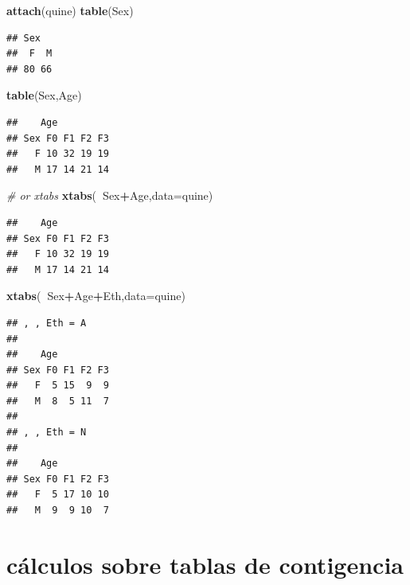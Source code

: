 \documentclass[]{book}
\newenvironment{Shaded}{\begin{snugshade}}{\end{snugshade}}
\newcommand{\KeywordTok}[1]{\textcolor[rgb]{0.13,0.29,0.53}{\textbf{#1}}}
\newcommand{\DataTypeTok}[1]{\textcolor[rgb]{0.13,0.29,0.53}{#1}}
\newcommand{\CommentTok}[1]{\textcolor[rgb]{0.56,0.35,0.01}{\textit{#1}}}
\newcommand{\OperatorTok}[1]{\textcolor[rgb]{0.81,0.36,0.00}{\textbf{#1}}}
\newcommand{\NormalTok}[1]{#1}
\begin{document}
\begin{Shaded}
\begin{Highlighting}[]
\KeywordTok{attach}\NormalTok{(quine)}
\KeywordTok{table}\NormalTok{(Sex)}
\end{Highlighting}
\end{Shaded}

\begin{verbatim}
## Sex
##  F  M 
## 80 66
\end{verbatim}

\begin{Shaded}
\begin{Highlighting}[]
\KeywordTok{table}\NormalTok{(Sex,Age)}
\end{Highlighting}
\end{Shaded}

\begin{verbatim}
##    Age
## Sex F0 F1 F2 F3
##   F 10 32 19 19
##   M 17 14 21 14
\end{verbatim}

\begin{Shaded}
\begin{Highlighting}[]
\CommentTok{# or xtabs}
\KeywordTok{xtabs}\NormalTok{(}\OperatorTok{~}\NormalTok{Sex}\OperatorTok{+}\NormalTok{Age,}\DataTypeTok{data=}\NormalTok{quine)}
\end{Highlighting}
\end{Shaded}

\begin{verbatim}
##    Age
## Sex F0 F1 F2 F3
##   F 10 32 19 19
##   M 17 14 21 14
\end{verbatim}

\begin{Shaded}
\begin{Highlighting}[]
\KeywordTok{xtabs}\NormalTok{(}\OperatorTok{~}\NormalTok{Sex}\OperatorTok{+}\NormalTok{Age}\OperatorTok{+}\NormalTok{Eth,}\DataTypeTok{data=}\NormalTok{quine)}
\end{Highlighting}
\end{Shaded}

\begin{verbatim}
## , , Eth = A
## 
##    Age
## Sex F0 F1 F2 F3
##   F  5 15  9  9
##   M  8  5 11  7
## 
## , , Eth = N
## 
##    Age
## Sex F0 F1 F2 F3
##   F  5 17 10 10
##   M  9  9 10  7
\end{verbatim}

\section{cálculos sobre tablas de
contigencia}\label{calculos-sobre-tablas-de-contigencia}
\end{document}
